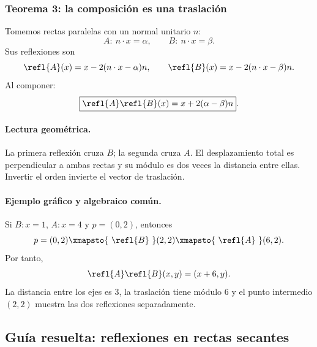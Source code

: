 \subsubsection{Teorema 3: la composición es una traslación}

Tomemos rectas paralelas con un normal unitario \(n\):
\[
  A:\ n\cdot x=\alpha,
  \qquad
  B:\ n\cdot x=\beta.
\]
Sus reflexiones son
\[
  \refl{A}(x)=x-2(n\cdot x-\alpha)n,
  \qquad
  \refl{B}(x)=x-2(n\cdot x-\beta)n.
\]
Al componer:
\[
  \boxed{\refl{A}\refl{B}(x)=x+2(\alpha-\beta)n}.
\]

\begin{center}
\end{center}

\paragraph{Lectura geométrica.}
La primera reflexión cruza \(B\); la segunda cruza \(A\). El desplazamiento total es
perpendicular a ambas rectas y su módulo es dos veces la distancia entre ellas. Invertir el
orden invierte el vector de traslación.

\paragraph{Ejemplo gráfico y algebraico común.}
Si \(B:x=1\), \(A:x=4\) y \(p=(0,2)\), entonces
\[
  p=(0,2)
  \xmapsto{\ \refl{B}\ }(2,2)
  \xmapsto{\ \refl{A}\ }(6,2).
\]
Por tanto,
\[
  \refl{A}\refl{B}(x,y)=(x+6,y).
\]
La distancia entre los ejes es \(3\), la traslación tiene módulo \(6\) y el punto intermedio
\((2,2)\) muestra las dos reflexiones separadamente.

\subsection{Guía resuelta: reflexiones en rectas secantes}

